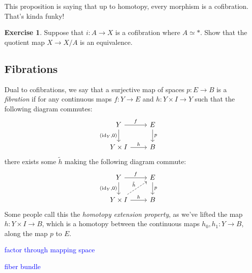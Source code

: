 \documentclass[10pt]{amsart}
\theoremstyle{definition}
\newtheorem{exercise}[thm]{Exercise}
\newcommand{\cdef}[1]{\textcolor{Bittersweet}{#1}}
\begin{document}
This proposition is saying that up to homotopy, every morphism is a cofibration. That's kinda funky!

\begin{exercise}
    Suppose that $i:A \to X$ is a cofibration where $A \simeq *$. Show that the quotient map $X \to X/A$ is an equivalence.
\end{exercise}

\subsection{Fibrations}
Dual to cofibrations, we say that a surjective map of spaces $p:E \to B$ is a \cdef{\emph{fibration}} if for any continuous maps $f:Y \to E$ and $h:Y \times I \to Y$ such that the following diagram commutes:
\[\begin{tikzcd}
	Y & E \\
	{Y \times I} & B
	\arrow["f", from=1-1, to=1-2]
	\arrow["{(\text{id}_Y, 0)}"', from=1-1, to=2-1]
	\arrow["p", from=1-2, to=2-2]
	\arrow["h", from=2-1, to=2-2]
\end{tikzcd}\]
there exists some $\tilde{h}$ making the following diagram commute:
\[\begin{tikzcd}
	Y & E \\
	{Y \times I} & B
	\arrow["f", from=1-1, to=1-2]
	\arrow["{(\text{id}_Y, 0)}"', from=1-1, to=2-1]
	\arrow["p", from=1-2, to=2-2]
	\arrow["{\tilde{h}}", dashed, from=2-1, to=1-2]
	\arrow["h", from=2-1, to=2-2]
\end{tikzcd}\]
Some people call this the \cdef{\emph{homotopy extension property}}, as we've lifted the map $h:Y \times I \to B$, which is a homotopy between the continuous maps $h_0, h_1:Y \to B$, along the map $p$ to $E$.

\textcolor{blue}{factor through mapping space}

\textcolor{blue}{fiber bundle}
\end{document}
